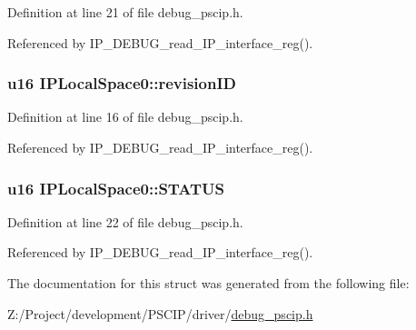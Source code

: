 Definition at line 21 of file debug\_\-pscip.h.

Referenced by IP\_\-DEBUG\_\-read\_\-IP\_\-interface\_\-reg().\hypertarget{struct_i_p_local_space0_d01c22f939b8e2b81582afcab4856e6c}{
\subsubsection[{revisionID}]{\setlength{\rightskip}{0pt plus 5cm}u16 {\bf IPLocalSpace0::revisionID}}}
\label{struct_i_p_local_space0_d01c22f939b8e2b81582afcab4856e6c}




Definition at line 16 of file debug\_\-pscip.h.

Referenced by IP\_\-DEBUG\_\-read\_\-IP\_\-interface\_\-reg().\hypertarget{struct_i_p_local_space0_95703e2f24619e296ac6b2a1f49f43e4}{
\subsubsection[{STATUS}]{\setlength{\rightskip}{0pt plus 5cm}u16 {\bf IPLocalSpace0::STATUS}}}
\label{struct_i_p_local_space0_95703e2f24619e296ac6b2a1f49f43e4}




Definition at line 22 of file debug\_\-pscip.h.

Referenced by IP\_\-DEBUG\_\-read\_\-IP\_\-interface\_\-reg().

The documentation for this struct was generated from the following file:\begin{CompactItemize}
\item 
Z:/Project/development/PSCIP/driver/\hyperlink{debug__pscip_8h}{debug\_\-pscip.h}\end{CompactItemize}
